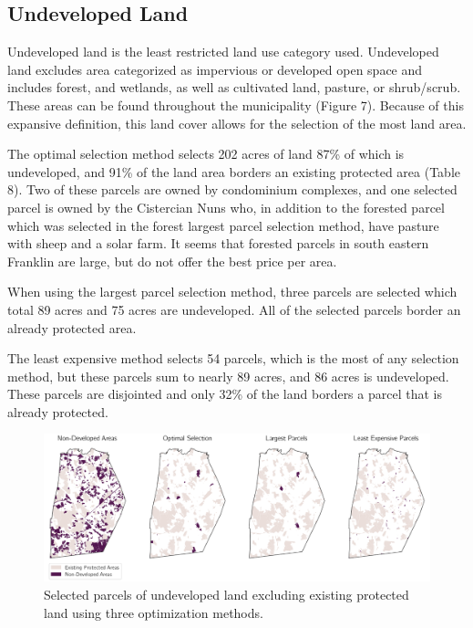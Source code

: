 \documentclass[12pt, stu, floatsintext,table]{apa7}
\begin{document}
\subsection{Undeveloped Land}
Undeveloped land is the least restricted land use category used. Undeveloped land excludes area categorized as impervious or developed open space and includes forest, and wetlands, as well as cultivated land, pasture, or shrub/scrub. These areas can be found throughout the municipality (Figure 7). Because of this expansive definition, this land cover allows for the selection of the most land area. 

The optimal selection method selects 202 acres of land 87\% of which is undeveloped, and 91\% of the land area borders an existing protected area (Table 8). Two of these parcels are owned by condominium complexes, and one selected parcel is owned by the Cistercian Nuns who, in addition to the forested parcel which was selected in the forest largest parcel selection method, have pasture with sheep and a solar farm. It seems that forested parcels in south eastern Franklin are large, but do not offer the best price per area.  

When using the largest parcel selection method, three parcels are selected which total 89 acres and 75 acres are undeveloped. All of the selected parcels border an already protected area. 


 The least expensive method selects 54 parcels, which is the most of any selection method, but these parcels sum to nearly 89 acres, and 86 acres is undeveloped. These parcels are disjointed and only 32\% of the land borders a parcel that is already protected. 
\begin{figure}[hbtp]
    \centering
    \includegraphics[width = \textwidth]{figures/n_61ndev.png}
    \caption{Selected parcels of undeveloped land excluding existing protected land using three optimization methods. }
\end{figure}
\end{document}

